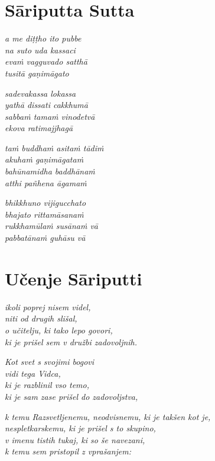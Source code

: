 

\cleartoverso
\chapter*{Sāriputta Sutta}

\emph{a me diṭṭho ito pubbe\\
na suto uda kassaci\\
evaṁ vagguvado satthā\\
tusitā gaṇimāgato}

\emph{sadevakassa lokassa\\
yathā dissati cakkhumā}\\
\emph{sabbaṁ tamaṁ vinodetvā\\
ekova ratimajjhagā}

\emph{taṁ buddhaṁ asitaṁ tādiṁ\\
akuhaṁ gaṇimāgataṁ}\\
\emph{bahūnamidha baddhānaṁ\\
atthi pañhena āgamaṁ}

\emph{bhikkhuno vijigucchato\\
bhajato rittamāsanaṁ}\\
\emph{rukkhamūlaṁ susānaṁ vā\\
pabbatānaṁ guhāsu vā}


\cleartorecto
\chapter{Učenje Sāriputti}

\emph{ikoli poprej nisem videl,\\
niti od drugih slišal,\\
o učitelju, ki tako lepo govori,\\
ki je prišel sem v družbi zadovoljnih.}

\emph{Kot svet s svojimi bogovi}\\
\emph{vidi tega Vidca,}\\
\emph{ki je razblinil vso temo,}\\
\emph{ki je sam zase prišel do zadovoljstva,}

\emph{k temu Razsvetljenemu, neodvisnemu, ki je takšen kot je,}\\
\emph{nespletkarskemu, ki je prišel s to skupino,}\\
\emph{v imenu tistih tukaj, ki so še navezani,}\\
\emph{k temu sem pristopil z vprašanjem:}

